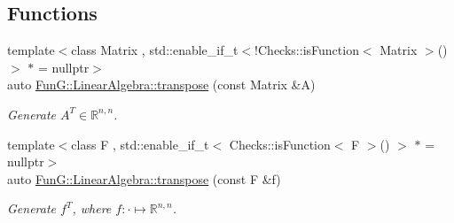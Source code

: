 \subsection*{Functions}
\begin{DoxyCompactItemize}
\item 
{\footnotesize template$<$class Matrix , std\+::enable\+\_\+if\+\_\+t$<$!\+Checks\+::is\+Function$<$ Matrix $>$()$>$ $\ast$  = nullptr$>$ }\\auto \hyperlink{group__LinearAlgebraGroup_ga6110875ecb3c2559f8f4b42a3627a65b}{Fun\+G\+::\+Linear\+Algebra\+::transpose} (const Matrix \&A)
\begin{DoxyCompactList}\small\item\em Generate $A^T\in\mathbb{R}^{n,n}$. \end{DoxyCompactList}\item 
{\footnotesize template$<$class F , std\+::enable\+\_\+if\+\_\+t$<$ Checks\+::is\+Function$<$ F $>$() $>$ $\ast$  = nullptr$>$ }\\auto \hyperlink{group__LinearAlgebraGroup_ga410ef1b161789c0c9f01ae5f5caf058f}{Fun\+G\+::\+Linear\+Algebra\+::transpose} (const F \&f)
\begin{DoxyCompactList}\small\item\em Generate $f^T$, where $f:\cdot\mapsto\mathbb{R}^{n,n} $. \end{DoxyCompactList}\end{DoxyCompactItemize}
